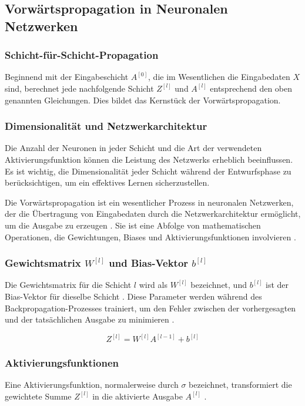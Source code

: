 \subsection{Vorwärtspropagation in Neuronalen Netzwerken}
\subsubsection{Schicht-für-Schicht-Propagation}
Beginnend mit der Eingabeschicht \( A^{[0]} \), die im Wesentlichen die Eingabedaten \( X \) sind, berechnet jede nachfolgende Schicht \( Z^{[l]} \) und \( A^{[l]} \) entsprechend den oben genannten Gleichungen. Dies bildet das Kernstück der Vorwärtspropagation.

\subsubsection{Dimensionalität und Netzwerkarchitektur}
Die Anzahl der Neuronen in jeder Schicht und die Art der verwendeten Aktivierungsfunktion können die Leistung des Netzwerks erheblich beeinflussen. Es ist wichtig, die Dimensionalität jeder Schicht während der Entwurfsphase zu berücksichtigen, um ein effektives Lernen sicherzustellen.

Die Vorwärtspropagation ist ein wesentlicher Prozess in neuronalen Netzwerken, der die Übertragung von Eingabedaten durch die Netzwerkarchitektur ermöglicht, um die Ausgabe zu erzeugen \cite[p.~1421]{russell2021ai}. Sie ist eine Abfolge von mathematischen Operationen, die Gewichtungen, Biases und Aktivierungsfunktionen involvieren \cite[p.~73]{Chollet2021}.

\subsubsection{Gewichtsmatrix \( W^{[l]} \) und Bias-Vektor \( b^{[l]} \)}
Die Gewichtsmatrix für die Schicht \( l \) wird als \( W^{[l]} \) bezeichnet, und \( b^{[l]} \) ist der Bias-Vektor für dieselbe Schicht \cite[p.~46]{heaton_2012}. Diese Parameter werden während des Backpropagation-Prozesses trainiert, um den Fehler zwischen der vorhergesagten und der tatsächlichen Ausgabe zu minimieren \cite[p.~41]{aggarwal_neural_networks_2018}.

\begin{equation}
Z^{[l]} = W^{[l]} A^{[l-1]} + b^{[l]}
\end{equation}

\subsubsection{Aktivierungsfunktionen}
Eine Aktivierungsfunktion, normalerweise durch \( \sigma \) bezeichnet, transformiert die gewichtete Summe \( Z^{[l]} \) in die aktivierte Ausgabe \( A^{[l]} \) \cite[p.~1421]{russell2021ai}.

